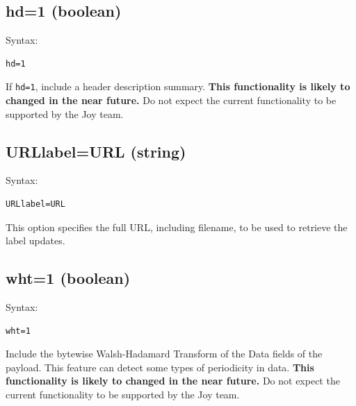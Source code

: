 \documentclass{book}
\begin{document}
\subsection{hd=1 (boolean)}
\label{hd}
\begin{mdframed}[style=aaa]
Syntax:
  \begin{verbatim}
hd=1                       
  \end{verbatim}
\end{mdframed}
If \texttt{hd=1}, include a header description summary.  \textbf{This
  functionality is likely to changed in the near future.}  Do not
expect the current functionality to be supported by the Joy team.


\subsection{URLlabel=URL (string)}
\label{}
\begin{mdframed}[style=aaa]
Syntax:
  \begin{verbatim}
URLlabel=URL               
  \end{verbatim}
\end{mdframed}
This option specifies the full URL, including filename, to be used to
retrieve the label updates.

\subsection{wht=1 (boolean)}
\label{wht}
\begin{mdframed}[style=aaa]
Syntax:
  \begin{verbatim}
wht=1                      
  \end{verbatim}
\end{mdframed}
Include the bytewise Walsh-Hadamard Transform of the Data fields of
the payload.  This feature can detect some types of periodicity in
data.  \textbf{This functionality is likely to changed in the near
  future.}  Do not expect the current functionality to be supported by
the Joy team.
\end{document}
